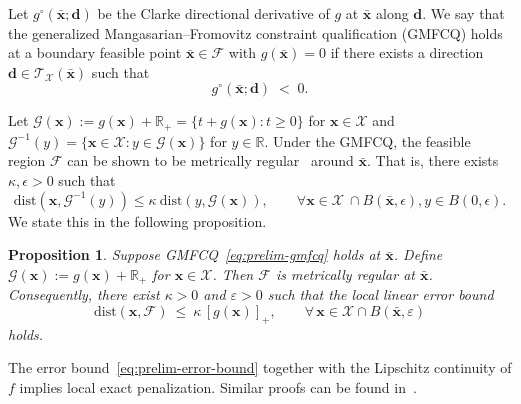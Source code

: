 \documentclass[11pt]{article}
\newtheorem{proposition}[theorem]{Proposition}
\def\bs{\boldsymbol}
\def\Re{\mathbb{R}}
\def\dist{\mathrm{dist}}
\def\T{\mathcal{T}}
\def\X{\mathcal{X}}
\begin{document}
Let $g^\circ(\bar{\bs{x}};\bs{d})$ be the Clarke directional derivative of $g$ at $\bar{\bs{x}}$ along $\bs{d}$.
We say that the generalized Mangasarian--Fromovitz constraint qualification (GMFCQ) holds at a boundary feasible point $\bar{\bs{x}}\in\mathcal{F}$ with $g(\bar{\bs{x}})=0$ if there exists a direction $\bs{d}\in\T_{\X}(\bar{\bs{x}})$ such that
\begin{equation} \label{eq:prelim-gmfcq}
g^\circ(\bar{\bs{x}};\bs{d})\;<\;0.
\end{equation}

Let $\mathcal{G}(\bs{x}):=g(\bs{x})+\Re_+ = \{t + g(\bs{x}):t \geq 0\}$ for $\bs{x}\in\X$ and $\mathcal{G}^{-1}(y) = \{\bs{x} \in \X:y \in \mathcal{G}(\bs{x})\}$ for $y \in \Re$. Under the GMFCQ, the feasible region $\mathcal{F}$ can be shown to be metrically regular~\cite[Definition 2.2]{burke1991exact} around $\bar{\bs{x}}$. That is, there exists $\kappa, \epsilon > 0$ such that 
\[
\dist(\bs{x}, \mathcal{G}^{-1}(y)) \leq \kappa~\dist(y, \mathcal{G}(\bs{x})), \qquad \forall \bs{x} \in \X~\cap B(\bar{\bs{x}}, \epsilon), y \in B(0, \epsilon).
\]
We state this in the following proposition.

\begin{proposition} \label{prop:prelim-gmfcq-mr}
Suppose GMFCQ~\eqref{eq:prelim-gmfcq} holds at $\bar{\bs{x}}$. Define $\mathcal{G}(\bs{x}):=g(\bs{x})+\Re_+$ for $\bs{x}\in\X$. Then $\mathcal{F}$ is metrically regular at $\bar{\bs{x}}$. Consequently, there exist $\kappa>0$ and $\varepsilon>0$ such that the local linear error bound
\begin{equation}\label{eq:prelim-error-bound}
\dist(\bs{x},\mathcal{F})
\ \le\ \kappa\,[g(\bs{x})]_+,
\qquad \forall\,\bs{x}\in \X\cap B(\bar{\bs{x}},\varepsilon)
\end{equation}
holds.
\end{proposition}

The error bound~\eqref{eq:prelim-error-bound} together with the Lipschitz continuity of $f$ implies local exact penalization. Similar proofs can be found in~\cite{le2012exact,chen2024penalty, luo1996exact}.
\end{document}
